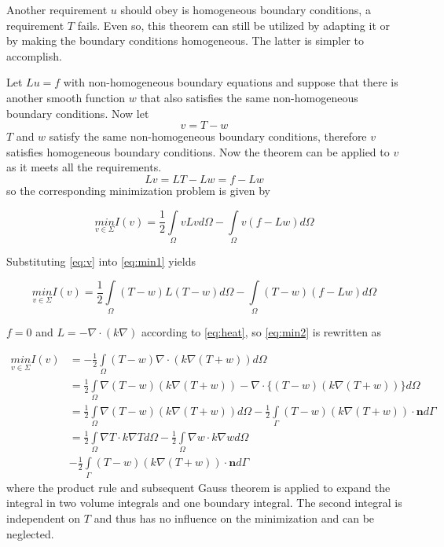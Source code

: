 \documentclass[10pt,a4paper]{article}
\begin{document}
Another requirement $u$ should obey is homogeneous boundary conditions, a requirement $T$ fails. Even so, this theorem can still be utilized by adapting it or by making the boundary conditions homogeneous. The latter is simpler to accomplish.

Let $Lu=f$ with non-homogeneous boundary equations and suppose that there is another smooth function $w$ that also satisfies the same non-homogeneous boundary conditions. Now let 
\begin{equation}\label{eq:v}
v=T-w
\end{equation}
$T$ and $w$ satisfy the same non-homogeneous boundary conditions, therefore $v$ satisfies homogeneous boundary conditions. Now the theorem can be applied to $v$ as it meets all the requirements. \\

\begin{equation}\label{rhsv}
Lv=LT-Lw=f-Lw
\end{equation}
so the corresponding minimization problem is given by 

\begin{equation}\label{eq:min1}
\underset{v\in\Sigma} {min}I(v) = \frac{1}{2}\underset{\Omega}{\int}vLvd\Omega-\underset{\Omega}{\int}v(f-Lw)d\Omega
\end{equation}

Substituting \eqref{eq:v} into \eqref{eq:min1} yields

\begin{equation}\label{eq:min2}
\underset{v\in\Sigma} {min}I(v) = \frac{1}{2}\underset{\Omega}{\int}(T-w)L(T-w)d\Omega-\underset{\Omega}{\int}(T-w)(f-Lw)d\Omega
\end{equation}

$f=0$ and $L = -\nabla\cdot( k\nabla)$ according to \eqref{eq:heat}, so \eqref{eq:min2} is rewritten as

\begin{equation}\label{eq:min3}
	\begin{split}
	\underset{v\in\Sigma} {min}I(v) & = -\frac{1}{2}\underset{\Omega}{\int}(T-w)\nabla\cdot(k\nabla(T+w))d\Omega\\
	&=\frac{1}{2}\underset{\Omega}{\int}\nabla (T-w)(k\nabla(T+w))-\nabla\cdot\{(T-w)(k\nabla(T+w))\}d\Omega\\
	&=\frac{1}{2}\underset{\Omega}{\int}\nabla (T-w)(k\nabla(T+w))d\Omega - \frac{1}{2}\underset{\Gamma}{\int}(T-w)(k\nabla(T+w))\cdot\textbf{\^{n}} d\Gamma\\
	&=\frac{1}{2}\underset{\Omega}{\int}\nabla T\cdot k \nabla T d\Omega - \frac{1}{2}\underset{\Omega}{\int}\nabla w\cdot k \nabla w d\Omega\\  &-\frac{1}{2}\underset{\Gamma}{\int}(T-w)(k\nabla(T+w))\cdot\textbf{\^{n}} d\Gamma
	\end{split}
\end{equation}
where the product rule and subsequent Gauss theorem is applied to expand the integral in two volume integrals and one boundary integral. The second integral is independent on $T$ and thus has no influence on the minimization and can be neglected. \\
\end{document}
